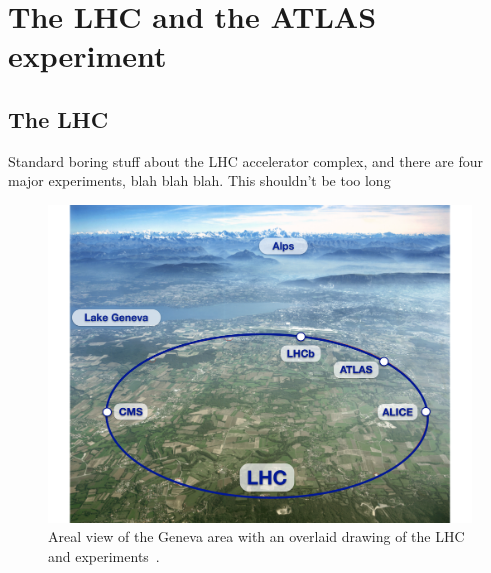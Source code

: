 \chapter[The LHC and the ATLAS experiment][The LHC and ATLAS]
        {The LHC and the ATLAS experiment}
\label{ch:lhc}

\FloatBarrier
\section{The LHC}

{\color{red}Standard boring stuff about the LHC accelerator complex, and there
  are four major experiments, blah blah blah. This shouldn't be too long}

\begin{figure}[ht]
  \centering
  \includegraphics[width=\textwidth, clip=true, trim=0 0 1cm 0]
    {figs/lhc/lhc_aerial.pdf}
  \caption{
    Areal view of the Geneva area with an overlaid drawing of the LHC
    and experiments~\cite{lhc_aerial}.
  }
  \label{fig:lhc_aerial}
\end{figure}

